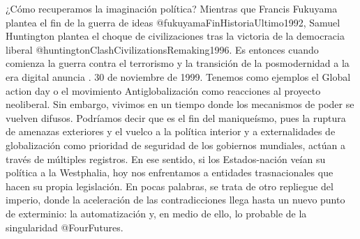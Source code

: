 \documentclass[
]{article}
\begin{document}
¿Cómo recuperamos la imaginación política? Mientras que Francis Fukuyama
plantea el fin de la guerra de ideas @fukuyamaFinHistoriaUltimo1992,
Samuel Huntington plantea el choque de civilizaciones tras la victoria
de la democracia liberal @huntingtonClashCivilizationsRemaking1996. Es
entonces cuando comienza la guerra contra el terrorismo y la transición
de la posmodernidad a la era digital anuncia . 30 de noviembre de 1999.
Tenemos como ejemplos el Global action day o el movimiento
Antiglobalización como reacciones al proyecto neoliberal. Sin embargo,
vivimos en un tiempo donde los mecanismos de poder se vuelven difusos.
Podríamos decir que es el fin del maniqueísmo, pues la ruptura de
amenazas exteriores y el vuelco a la política interior y a
externalidades de globalización como prioridad de seguridad de los
gobiernos mundiales, actúan a través de múltiples registros. En ese
sentido, si los Estados-nación veían su política a la Westphalia, hoy
nos enfrentamos a entidades trasnacionales que hacen su propia
legislación. En pocas palabras, se trata de otro repliegue del imperio,
donde la aceleración de las contradicciones llega hasta un nuevo punto
de exterminio: la automatización y, en medio de ello, lo probable de la
singularidad @FourFutures.
\end{document}
